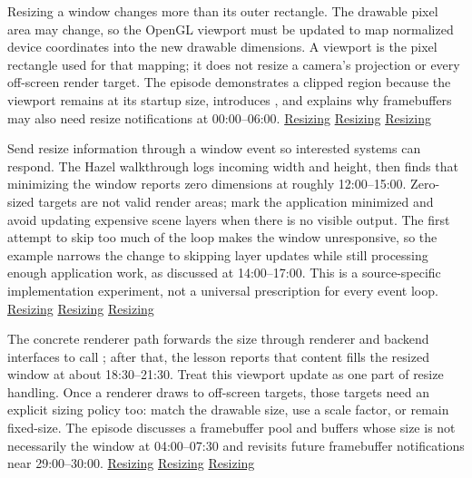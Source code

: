\hypertarget{06-engine-ii-ch026-resize-the-drawable-area-then-decide-what-the-camera-should-show}{}

Resizing a window changes more than its outer rectangle. The drawable pixel area may change, so the OpenGL viewport must be updated to map normalized device coordinates into the new drawable dimensions. A viewport is the pixel rectangle used for that mapping; it does not resize a camera's projection or every off-screen render target. The episode demonstrates a clipped region because the viewport remains at its startup size, introduces , and explains why framebuffers may also need resize notifications at 00:00--06:00. \href{https://www.youtube.com/watch?v=7LswjvgRqbw&t=0s}{Resizing} \href{https://www.youtube.com/watch?v=7LswjvgRqbw&t=120s}{Resizing} \href{https://www.youtube.com/watch?v=7LswjvgRqbw&t=240s}{Resizing}

Send resize information through a window event so interested systems can respond. The Hazel walkthrough logs incoming width and height, then finds that minimizing the window reports zero dimensions at roughly 12:00--15:00. Zero-sized targets are not valid render areas; mark the application minimized and avoid updating expensive scene layers when there is no visible output. The first attempt to skip too much of the loop makes the window unresponsive, so the example narrows the change to skipping layer updates while still processing enough application work, as discussed at 14:00--17:00. This is a source-specific implementation experiment, not a universal prescription for every event loop. \href{https://www.youtube.com/watch?v=7LswjvgRqbw&t=720s}{Resizing} \href{https://www.youtube.com/watch?v=7LswjvgRqbw&t=840s}{Resizing} \href{https://www.youtube.com/watch?v=7LswjvgRqbw&t=900s}{Resizing}

The concrete renderer path forwards the size through renderer and backend interfaces to call ; after that, the lesson reports that content fills the resized window at about 18:30--21:30. Treat this viewport update as one part of resize handling. Once a renderer draws to off-screen targets, those targets need an explicit sizing policy too: match the drawable size, use a scale factor, or remain fixed-size. The episode discusses a framebuffer pool and buffers whose size is not necessarily the window at 04:00--07:30 and revisits future framebuffer notifications near 29:00--30:00. \href{https://www.youtube.com/watch?v=7LswjvgRqbw&t=1110s}{Resizing} \href{https://www.youtube.com/watch?v=7LswjvgRqbw&t=240s}{Resizing} \href{https://www.youtube.com/watch?v=7LswjvgRqbw&t=1740s}{Resizing}

